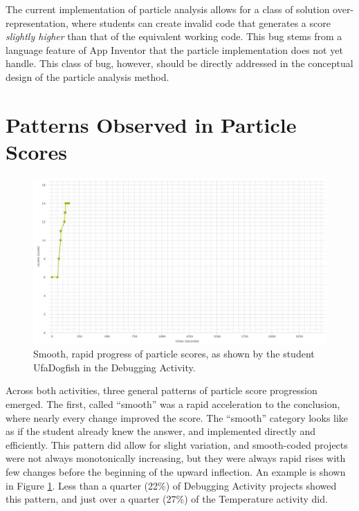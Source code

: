 The current implementation of particle analysis allows for a class of solution over-representation, where students can create invalid code that generates a score \emph{slightly higher} than that of the equivalent working code. This bug stems from a language feature of App Inventor that the particle implementation does not yet handle. This class of bug, however, should be directly addressed in the conceptual design of the particle analysis method.


\section{Patterns Observed in Particle Scores}
\label{sec:patterns}

\begin{figure}
	\centering
	\includegraphics[width=\textwidth]{images/stories/scores-debug-UfaDogfish}
	\caption[Smooth, Rapid Progress of Particle Scores]{Smooth, rapid progress of particle scores, as shown by the student UfaDogfish in the Debugging Activity.}
	\label{fig:smooth_chart}
\end{figure}
Across both activities, three general patterns of particle score progression emerged. The first, called ``smooth'' was a rapid acceleration to the conclusion, where nearly every change improved the score. The ``smooth'' category looks like as if the student already knew the answer, and implemented directly and efficiently. This pattern did allow for slight variation, and smooth-coded projects were not always monotonically increasing, but they were always rapid rises with few changes before the beginning of the upward inflection. An example is shown in Figure \ref{fig:smooth_chart}. Less than a quarter (22\%) of Debugging Activity projects showed this pattern, and just over a quarter (27\%) of the Temperature activity did.

